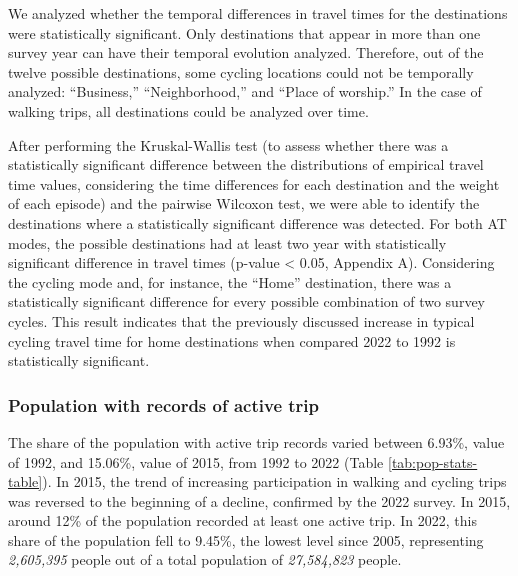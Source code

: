 \documentclass[preprint, 3p,
authoryear]{elsarticle} %
\begin{document}
We analyzed whether the temporal differences in travel times for the
destinations were statistically significant. Only destinations that
appear in more than one survey year can have their temporal evolution
analyzed. Therefore, out of the twelve possible destinations, some
cycling locations could not be temporally analyzed: ``Business,''
``Neighborhood,'' and ``Place of worship.'' In the case of walking
trips, all destinations could be analyzed over time.

After performing the Kruskal-Wallis test (to assess whether there was a
statistically significant difference between the distributions of
empirical travel time values, considering the time differences for each
destination and the weight of each episode) and the pairwise Wilcoxon
test, we were able to identify the destinations where a statistically
significant difference was detected. For both AT modes, the possible
destinations had at least two year with statistically significant
difference in travel times (p-value \textless{} 0.05, Appendix A).
Considering the cycling mode and, for instance, the ``Home''
destination, there was a statistically significant difference for every
possible combination of two survey cycles. This result indicates that
the previously discussed increase in typical cycling travel time for
home destinations when compared 2022 to 1992 is statistically
significant.

\subsubsection{Population with records of active
trip}\label{population-with-records-of-active-trip}

The share of the population with active trip records varied between
6.93\%, value of 1992, and 15.06\%, value of 2015, from 1992 to 2022
(Table \ref{tab:pop-stats-table}). In 2015, the trend of increasing
participation in walking and cycling trips was reversed to the beginning
of a decline, confirmed by the 2022 survey. In 2015, around 12\% of the
population recorded at least one active trip. In 2022, this share of the
population fell to 9.45\%, the lowest level since 2005, representing
\emph{2,605,395} people out of a total population of \emph{27,584,823}
people.
\end{document}
